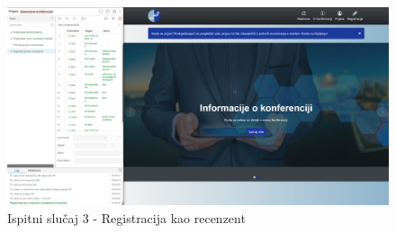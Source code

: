			    \begin{figure}[H]
			 	\includegraphics[width= 15 cm, height= 25 cm, keepaspectratio]{slike/test_registracija_kao_recenzent.png} 
			 	\centering
			 	\caption{Ispitni slučaj 3 - Registracija kao recenzent}
			 	\label{fig:act5}
			 \end{figure}
			
